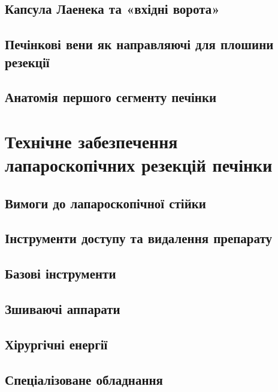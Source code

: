 \begin{refsection}
\subsection{Капсула Лаенека та «вхідні ворота»}

\subsection{Печінкові вени як направляючі для плошини резекції}

\subsection{Анатомія першого сегменту печінки}

\section{Технічне забезпечення лапароскопічних резекцій печінки}

\subsection{Вимоги до лапароскопічної стійки}

\subsection{Інструменти доступу та видалення препарату}

\subsection{Базові інструменти}

\subsection{Зшиваючі аппарати}

\subsection{Хірургічні енергії}

\subsection{Спеціалізоване обладнання}

\printbibliography [heading=subbibliography]
\end{refsection}